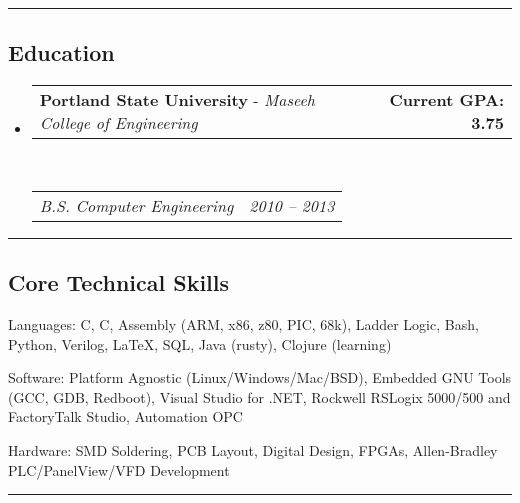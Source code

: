 \documentclass[10pt,letterpaper]{article}
\makeatletter
\newenvironment{indentsection}[1]%
{\begin{list}{}%
	{\setlength{\leftmargin}{#1}}%
	\item[]%
}
{\end{list}}
\newcommand{\headerrow}[2]
{\begin{tabular*}{\linewidth}{l@{\extracolsep{\fill}}r}
	#1 &
	#2 \\
\end{tabular*}}
\newcommand{\CPP}
{C\nolinebreak[4]\hspace{-.05em}\raisebox{.22ex}{\footnotesize\bf ++}}
\makeatother
\begin{document}
\hrule
\vspace{-0.4em}
\subsection*{Education}

\begin{itemize}
	\parskip=0.1em

	\item 
	\headerrow
  {\textbf{Portland State University} - \emph{Maseeh College of Engineering}}
		{\textbf{Current GPA: 3.75}}
	\\
	\headerrow
		{\emph{B.S. Computer Engineering}}
		{\emph{2010 -- 2013}}
\end{itemize}

\hrule
\vspace{-0.4em}
\subsection*{Core Technical Skills}

\begin{indentsection}{\parindent}
\begin{description*}
	\item[Languages:]
    C, \CPP, Assembly (ARM, x86, z80, PIC, 68k), Ladder Logic, Bash, Python, Verilog, \LaTeX, SQL, Java (rusty), Clojure (learning)
	\item[Software:]
    Platform Agnostic (Linux/Windows/Mac/BSD), Embedded GNU Tools (GCC, GDB, Redboot), Visual Studio for .NET, Rockwell RSLogix 5000/500 and FactoryTalk Studio, Automation OPC 
	\item[Hardware:]
    SMD Soldering, PCB Layout, Digital Design, FPGAs, Allen-Bradley PLC/PanelView/VFD Development 

\end{description*}
\end{indentsection}

\hrule
\vspace{-0.4em}
\end{document}
